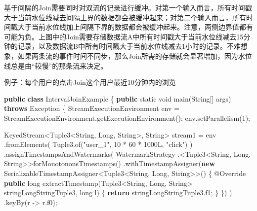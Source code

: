 \documentclass[cn,11pt,chinese]{elegantbook}
\newenvironment{Shaded}{}{}
\newcommand{\AttributeTok}[1]{\textcolor[rgb]{0.49,0.56,0.16}{#1}}
\newcommand{\BuiltInTok}[1]{#1}
\newcommand{\DataTypeTok}[1]{\textcolor[rgb]{0.56,0.13,0.00}{#1}}
\newcommand{\DecValTok}[1]{\textcolor[rgb]{0.25,0.63,0.44}{#1}}
\newcommand{\FunctionTok}[1]{\textcolor[rgb]{0.02,0.16,0.49}{#1}}
\newcommand{\KeywordTok}[1]{\textcolor[rgb]{0.00,0.44,0.13}{\textbf{#1}}}
\newcommand{\NormalTok}[1]{#1}
\newcommand{\StringTok}[1]{\textcolor[rgb]{0.25,0.44,0.63}{#1}}
\begin{document}
基于间隔的Join需要同时对双流的记录进行缓冲。对第一个输入而言，所有时间戳大于当前水位线减去间隔上界的数据都会被缓冲起来；对第二个输入而言，所有时间戳大于当前水位线加上间隔下界的数据都会被缓冲起来。注意，两侧边界值都有可能为负。上图中的Join需要存储数据流A中所有时间戳大于当前水位线减去15分钟的记录，以及数据流B中所有时间戳大于当前水位线减去1小时的记录。不难想象，如果两条流的事件时间不同步，那么Join所需的存储就会显著增加，因为水位线总是由``较慢''的那条流来决定。

例子：每个用户的点击Join这个用户最近10分钟内的浏览

\begin{Shaded}
\begin{Highlighting}[]
\KeywordTok{public} \KeywordTok{class}\NormalTok{ IntervalJoinExample \{}
    \KeywordTok{public} \DataTypeTok{static} \DataTypeTok{void} \FunctionTok{main}\NormalTok{(}\BuiltInTok{String}\NormalTok{[] args) }\KeywordTok{throws} \BuiltInTok{Exception}\NormalTok{ \{}
\NormalTok{        StreamExecutionEnvironment env = StreamExecutionEnvironment.}\FunctionTok{getExecutionEnvironment}\NormalTok{();}
\NormalTok{        env.}\FunctionTok{setParallelism}\NormalTok{(}\DecValTok{1}\NormalTok{);}

\NormalTok{        KeyedStream\textless{}Tuple3\textless{}}\BuiltInTok{String}\NormalTok{, }\BuiltInTok{Long}\NormalTok{, }\BuiltInTok{String}\NormalTok{\textgreater{}, }\BuiltInTok{String}\NormalTok{\textgreater{} stream1 = env}
\NormalTok{            .}\FunctionTok{fromElements}\NormalTok{(}
\NormalTok{                Tuple3.}\FunctionTok{of}\NormalTok{(}\StringTok{"user\_1"}\NormalTok{, }\DecValTok{10}\NormalTok{ * }\DecValTok{60}\NormalTok{ * }\DecValTok{1000L}\NormalTok{, }\StringTok{"click"}\NormalTok{)}
\NormalTok{            )}
\NormalTok{            .}\FunctionTok{assignTimestampsAndWatermarks}\NormalTok{(}
\NormalTok{                WatermarkStrategy}
\NormalTok{                    .\textless{}Tuple3\textless{}}\BuiltInTok{String}\NormalTok{, }\BuiltInTok{Long}\NormalTok{, }\BuiltInTok{String}\NormalTok{\textgreater{}\textgreater{}}\FunctionTok{forMonotonousTimestamps}\NormalTok{()}
\NormalTok{                    .}\FunctionTok{withTimestampAssigner}\NormalTok{(}\KeywordTok{new}\NormalTok{ SerializableTimestampAssigner\textless{}Tuple3\textless{}}\BuiltInTok{String}\NormalTok{, }\BuiltInTok{Long}\NormalTok{, }\BuiltInTok{String}\NormalTok{\textgreater{}\textgreater{}() \{}
                        \AttributeTok{@Override}
                        \KeywordTok{public} \DataTypeTok{long} \FunctionTok{extractTimestamp}\NormalTok{(Tuple3\textless{}}\BuiltInTok{String}\NormalTok{, }\BuiltInTok{Long}\NormalTok{, }\BuiltInTok{String}\NormalTok{\textgreater{} stringLongStringTuple3, }\DataTypeTok{long}\NormalTok{ l) \{}
                            \KeywordTok{return}\NormalTok{ stringLongStringTuple3.}\FunctionTok{f1}\NormalTok{;}
\NormalTok{                        \}}
\NormalTok{                    \})}
\NormalTok{            )}
\NormalTok{            .}\FunctionTok{keyBy}\NormalTok{(r {-}\textgreater{} r.}\FunctionTok{f0}\NormalTok{);}


\end{Highlighting}
\end{Shaded}
\end{document}
